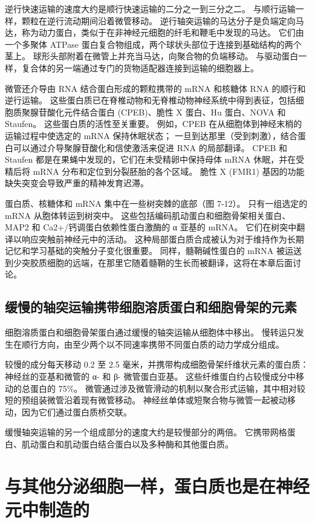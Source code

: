逆行快速运输的速度大约是顺行快速运输的二分之一到三分之二。 与顺行运输一样，颗粒在逆行流动期间沿着微管移动。 逆行轴突运输的马达分子是负端定向马达，称为动力蛋白，类似于在非神经元细胞的纤毛和鞭毛中发现的马达。 它们由一个多聚体 ATPase 蛋白复合物组成，两个球状头部位于连接到基础结构的两个茎上。 球形头部附着在微管上并充当马达，向聚合物的负端移动。 与驱动蛋白一样，复合体的另一端通过专门的货物适配器连接到运输的细胞器上。

微管还介导由 RNA 结合蛋白形成的颗粒携带的 mRNA 和核糖体 RNA 的顺行和逆行运输。 这些蛋白质已在脊椎动物和无脊椎动物神经系统中得到表征，包括细胞质聚腺苷酸化元件结合蛋白 (CPEB)、脆性 X 蛋白、Hu 蛋白、NOVA 和 Staufen。 这些蛋白质的活性至关重要。 例如，CPEB 在从细胞体到神经末梢的运输过程中使选定的 mRNA 保持休眠状态； 一旦到达那里（受到刺激），结合蛋白可以通过介导聚腺苷酸化和信使激活来促进 RNA 的局部翻译。 CPEB 和 Staufen 都是在果蝇中发现的，它们在未受精卵中保持母体 mRNA 休眠，并在受精后将 mRNA 分布和定位到分裂胚胎的各个区域。 脆性 X (FMR1) 基因的功能缺失突变会导致严重的精神发育迟滞。

蛋白质、核糖体和 mRNA 集中在一些树突棘的底部（图 7-12）。 只有一组选定的 mRNA 从胞体转运到树突中。 这些包括编码肌动蛋白和细胞骨架相关蛋白、MAP2 和 Ca2+/钙调蛋白依赖性蛋白激酶的 α 亚基的 mRNA。 它们在树突中翻译以响应突触前神经元中的活动。 这种局部蛋白质合成被认为对于维持作为长期记忆和学习基础的突触分子变化很重要。 同样，髓鞘碱性蛋白的 mRNA 被运送到少突胶质细胞的远端，在那里它随着髓鞘的生长而被翻译，这将在本章后面讨论。

\subsection{缓慢的轴突运输携带细胞溶质蛋白和细胞骨架的元素}

细胞溶质蛋白和细胞骨架蛋白通过缓慢的轴突运输从细胞体中移出。 慢转运只发生在顺行方向，由至少两个以不同速率携带不同蛋白质的动力学成分组成。

较慢的成分每天移动 0.2 至 2.5 毫米，并携带构成细胞骨架纤维状元素的蛋白质：神经丝的亚基和微管的 α- 和 β- 微管蛋白亚基。 这些纤维蛋白约占较慢成分中移动的总蛋白的 75\%。 微管通过涉及微管滑动的机制以聚合形式运输，其中相对较短的预组装微管沿着现有微管移动。 神经丝单体或短聚合物与微管一起被动移动，因为它们通过蛋白质桥交联。

缓慢轴突运输的另一个组成部分的速度大约是较慢部分的两倍。 它携带网格蛋白、肌动蛋白和肌动蛋白结合蛋白以及多种酶和其他蛋白质。


\section{与其他分泌细胞一样，蛋白质也是在神经元中制造的}
